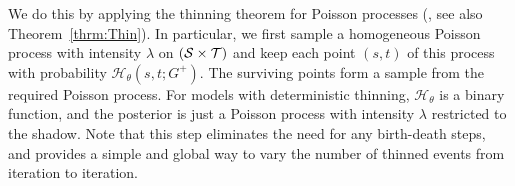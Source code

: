 \documentclass{statsoc}
\begin{document}
We do this by applying the thinning theorem for Poisson processes (\cite{Lewis1979}, see also Theorem~\ref{thrm:Thin}). 
In particular, we first sample %
a homogeneous Poisson process with intensity $\lambda$ on $({\mathcal S} \times {\mathcal T})$ and keep each point $(s,t)$ of this process with probability 
$\mathscr{H}_{\theta}(s, t;G^+)$. The surviving points form a sample
from the required Poisson process. For models with deterministic thinning, $\mathscr{H}_{\theta}$ is a binary function, and the posterior is just a Poisson
process with intensity $\lambda$ restricted to the shadow. 
Note that this step eliminates the need for any birth-death steps, and provides a simple and global way to vary the number of thinned events from 
iteration to iteration. %
\end{document}
